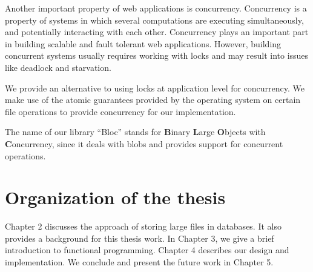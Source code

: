 Another important property of web applications is concurrency. Concurrency is a property of systems in which several computations are executing simultaneously, and potentially interacting with each other. Concurrency plays an important part in building scalable and fault tolerant web applications. However, building concurrent systems usually requires working with locks and may result into issues like deadlock and starvation.

We provide an alternative to using locks at application level for concurrency. We make use of the atomic guarantees provided by the operating system on certain file operations to provide concurrency for our implementation.

The name of our library ``Bloc'' stands for \textbf{B}inary \textbf{L}arge \textbf{O}bjects with \textbf{C}oncurrency, since it deals with blobs and provides support for concurrent operations.

\section{Organization of the thesis}
Chapter 2 discusses the approach of storing large files in databases. It also provides a background for this thesis work. In Chapter 3, we give a brief introduction to functional programming. Chapter 4 describes our design and implementation. We conclude and present the future work in Chapter 5.
